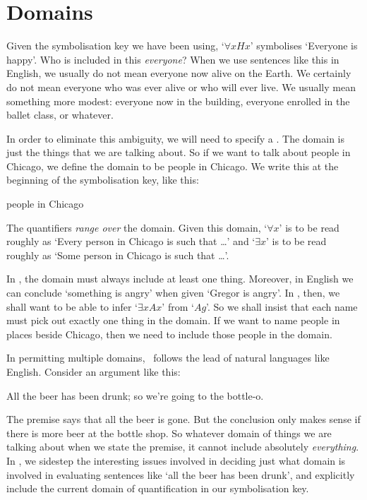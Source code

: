 \section{Domains}\label{sec_domains}
Given the symbolisation key we have been using, `$\forall xHx$' symbolises `Everyone is happy'.  Who is included in this \emph{everyone}? When we use sentences like this in English, we usually do not mean everyone now alive on the Earth. We certainly do not mean everyone who was ever alive or who will ever live. We usually mean something more modest: everyone now in the building, everyone enrolled in the ballet class, or whatever.

In order to eliminate this ambiguity, we will need to specify a . The domain is just the things that we are talking about. So if we want to talk about people in Chicago, we define the domain to be people in Chicago. We write this at the beginning of the symbolisation key, like this:
	\begin{ekey}
		\item[\text{domain}] people in Chicago
	\end{ekey}
The quantifiers \emph{range over} the domain. Given this domain, `$\forall x$' is to be read roughly as `Every person in Chicago is such that …' and `$\exists x$' is to be read roughly as `Some person in Chicago is such that …'. 

In \FOL, the domain must always include at least one thing. Moreover, in English we can conclude `something is angry' when given `Gregor is angry'. In \FOL, then, we shall want to be able to infer `$\exists x Ax$' from `$Ag$'. So we shall insist that each name must pick out exactly one thing in the domain. If we want to name people in places beside Chicago, then we need to include those people in the domain. 

In permitting multiple domains, \FOL\ follows the lead of natural languages like English. Consider an argument like this: \begin{earg}
	\item[\ex{ex.qdr}] All the beer has been drunk; so we're going to the bottle-o. 
\end{earg} The premise says that all the beer is gone. But the conclusion only makes sense if there is more beer at the bottle shop. So whatever domain of things we are talking about when we state the premise, it cannot include absolutely \emph{everything}. In \FOL, we sidestep the interesting issues involved in deciding just what domain is involved in evaluating sentences like `all the beer has been drunk', and explicitly include the current domain of quantification in our symbolisation key.

